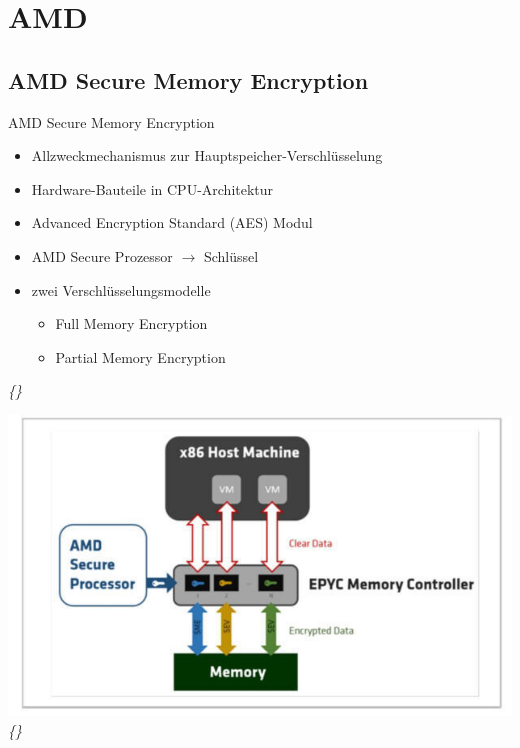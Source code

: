 \documentclass{sdqbeamer}
\begin{document}
\section{AMD}

\subsection{AMD Secure Memory Encryption}
\begin{frame}{AMD Secure Memory Encryption}
	\begin{minipage}{0.49\linewidth}
		\begin{itemize}
			\item Allzweckmechanismus zur Hauptspeicher-Verschlüsselung
			\item Hardware-Bauteile in CPU-Architektur
			\item Advanced Encryption Standard (AES) Modul
			\item AMD Secure Prozessor \(\rightarrow\) Schlüssel
			\item zwei Verschlüsselungsmodelle
			\begin{itemize}
				\item Full Memory Encryption
				\item Partial Memory Encryption
			\end{itemize}
		\end{itemize}
		\vspace{3ex}
		\vfill
		\small\textit{\{\cite{kaplan}\}}
	\end{minipage}
	\begin{minipage}{0.5\linewidth}
		\begin{center}
			\includegraphics[width=\linewidth]{Bilder/AMD_SMESEV.jpg} \\
			\small\textit{\{\cite{amd}\}}
		\end{center}
	\end{minipage}
\end{frame}
\end{document}
